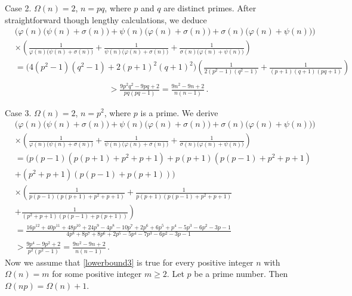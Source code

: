 \documentclass[12pt]{article}
\begin{document}
Case 2. \; $\Omega(n)=2$, $n=pq$, where $p$ and $q$ are distinct primes. After straightforward though lengthy calculations, we deduce
\begin{align*}
&\Big(\varphi(n)\big(\psi(n)+\sigma(n)\big)+\psi(n)\big(\varphi(n)+\sigma(n)\big)+\sigma(n)\big(\varphi(n)+\psi(n)\big)\Big)\\
&\times\left(\frac{1}{\varphi(n)\big(\psi(n)+\sigma(n)\big)}+\frac{1}{\psi(n)\big(\varphi(n)+\sigma(n)\big)}+\frac{1}{\sigma(n)\big(\varphi(n)+\psi(n)\big)}\right)\\
&=\big(4(p^2-1)(q^2-1)+2(p+1)^2(q+1)^2\big)\left(\frac{1}{2(p^2-1)(q^2-1)}+\frac{1}{(p+1)(q+1)(pq+1)}\right)\\   
\end{align*}
\begin{align*}
&>\frac{9p^2q^2-9pq+2}{pq(pq-1)}=\frac{9n^2-9n+2}{n(n-1)}\,.
\end{align*}

Case 3. \; $\Omega(n)=2$, $n=p^2$, where $p$ is a prime. We derive
\begin{align*}
&\Big(\varphi(n)\big(\psi(n)+\sigma(n)\big)+\psi(n)\big(\varphi(n)+\sigma(n)\big)+\sigma(n)\big(\varphi(n)+\psi(n)\big)\Big)\\
&\times\left(\frac{1}{\varphi(n)\big(\psi(n)+\sigma(n)\big)}+\frac{1}{\psi(n)\big(\varphi(n)+\sigma(n)\big)}+\frac{1}{\sigma(n)\big(\varphi(n)+\psi(n)\big)}\right)\\
&=\big(p(p-1)(p(p+1)+p^2+p+1) +  p(p+1)(p(p-1)+p^2+p+1) \\
&+ (p^2+p+1)(p(p-1)+p(p+1))\big)\\
&\times\left(\frac{1}{p(p-1)(p(p+1)+p^2+p+1)}+\frac{1}{p(p+1)(p(p-1)+p^2+p+1)}\right.\\
&\left.+\frac{1}{(p^2+p+1)(p(p-1)+p(p+1))}\right)\\    
&=\frac{16p^{12}+40p^{11}+48p^{10}+24p^9-4p^8-10p^7+2p^6+6p^5+p^4-5p^3-6p^2-3p-1}{4p^8+8p^7+8p^6+2p^5-5p^4-7p^3-6p^2-3p-1}\\
&>\frac{9p^4-9p^2+2}{p^2(p^2-1)}=\frac{9n^2-9n+2}{n(n-1)}\,.
\end{align*}
Now we assume that \eqref{lowerbound3} is true for every positive integer $n$ with $\Omega(n)=m$ for some positive integer $m\geq2$.
Let $p$ be a prime number. Then $\Omega(np)=\Omega(n)+1$.
\end{document}

